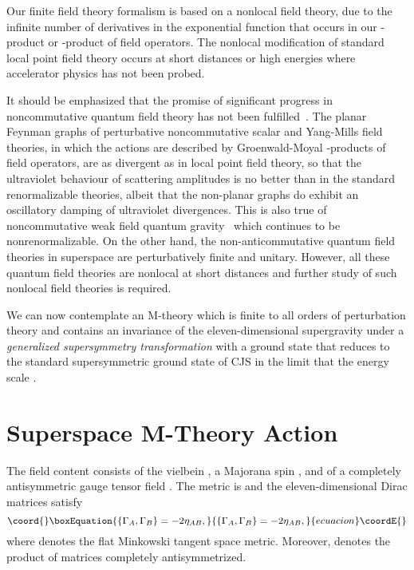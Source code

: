 \documentclass[a4paper,12pt]{article}
\begin{document}
Our finite field theory formalism is based on a nonlocal field theory, due to the
infinite number of derivatives in the exponential function that occurs in our
\myHighlight{$\circ$}\coordHE{}-product or \myHighlight{$\diamondsuit$}\coordHE{}-product of field operators. The nonlocal
modification of standard local point field theory occurs at short distances or high
energies where accelerator physics has not been probed.

It should be emphasized that the promise of significant progress in
noncommutative quantum field theory has not been
fulfilled~\cite{Szabo,Moffat6,Moffat7}. The planar Feynman graphs of perturbative
noncommutative scalar and Yang-Mills field theories, in which the actions are
described by Groenwald-Moyal \myHighlight{$\star$}\coordHE{}-products of field operators, are as divergent
as in local point field theory, so that the ultraviolet behaviour of scattering
amplitudes is no better than in the standard renormalizable theories, albeit that
the non-planar graphs do exhibit an oscillatory damping of ultraviolet
divergences. This is also true of noncommutative weak field quantum
gravity~\cite{Moffat6,Moffat7} which continues to be nonrenormalizable. On the other
hand, the non-anticommutative quantum field theories in superspace are perturbatively
finite and unitary. However, all these quantum field theories are nonlocal at short
distances and further study of such nonlocal field theories is required.

We can now contemplate an M-theory which is finite to all orders of
perturbation theory and contains an invariance of the eleven-dimensional
supergravity under a {\it generalized supersymmetry transformation} with a
ground state that reduces to the standard supersymmetric ground state of
CJS in the limit that the energy scale \myHighlight{$\Lambda\rightarrow\infty$}\coordHE{}.

\section{\bf Superspace M-Theory Action}

The field content consists of the vielbein \coordHE{}, a
Majorana spin \coordHE{}  \coordHE{}, and of a completely antisymmetric
gauge tensor field \coordHE{}. The metric is \coordHE{} and the
eleven-dimensional Dirac matrices satisfy
\begin{equation}\coord{}\boxEquation{
\{\Gamma_A,\Gamma_B\}=-2\eta_{AB},
}{
\{\Gamma_A,\Gamma_B\}=-2\eta_{AB},
}{ecuacion}\coordE{}\end{equation}
where \coordHE{} denotes the flat Minkowski tangent space metric.
Moreover, \coordHE{} denotes the product of \coordHE{} matrices
completely antisymmetrized.
\end{document}
